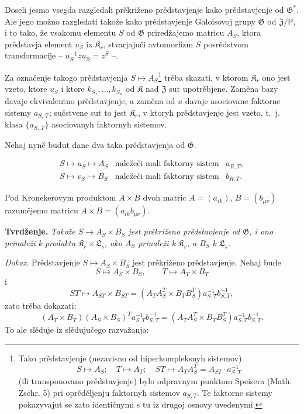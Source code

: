 \documentclass[11pt]{article}
\newcommand{\srcfn}[2]{\footnote{#2}}
\begin{document}
Doseli jesmo vsegda razgledali prěkriženo prědstavjenje kako prědstavjenje od \(\mathfrak{G}^*\). Ale jego možno razgledati takože kako prědstavjenje Galoisovoj grupy \(\mathfrak{G}\) od \(\mathfrak Z/\mathsf{P}\), i to tako, že vsakomu elementu \(S\) od \(\mathfrak{G}\) priredžajemo matricu \(A_S\), ktora prědstavja element \(u_S\) iz \(\mathfrak K_r\), stvarjajuči avtomorfizm \(S\) posrědstvom transformacije -- \(u_S^{-1}zu_S=z^S\) --.

Za označenje takogo prědstavjenja \(S\mapsto A_S\)\srcfn{1}{Tako prědstavjenje (nezavisno od hiperkompleksnyh sistemov)
\[
S\mapsto A_S;\quad T\mapsto A_T;\quad ST\mapsto A_TA_S^T=A_{ST}\cdot a_{S,T}^{-1}
\]
(ili transponovano prědstavjenje) bylo odpravnym punktom Speisera (Math. Zschr. 5) pri oprěděljenju faktornyh sistemov \(a_{S,T}\). Te faktorne sistemy pokazyvajut se zato identičnymi s tu iz drugoj osnovy uvedenymi.} trěba skazati, v ktorom \(\mathfrak K_r\) ono jest vzeto, ktore \(u_S\) i ktore \(k_{S_1},\ldots,k_{S_n}\) od \(\mathfrak K\) nad \(\mathfrak Z\) sut upotrěbjene. Zaměna bazy davaje ekvivalentno prědstavjenje, a zaměna od \(u\) davaje asociovane faktorne sistemy \(a_{S,\,T}\); sučstvene sut to jest \(\mathfrak K_r\), v ktoryh prědstavjenje jest vzeto, t.~j. klasa \(\{a_{S,\,T}\}\) asociovanyh faktornyh sistemov.

Nehaj nyně budut dane dva taka prědstavjenja od \(\mathfrak G\).

\[
\begin{array}{lll}
S\mapsto u_S\mapsto A_S & \text{naležeči mali faktorny sistem} & a_{R,T},\\
S\mapsto v_S\mapsto B_S & \text{naležeči mali faktorny sistem} & b_{R,T}.
\end{array}
\]

Pod Kronekerovym produktom \(A\times B\) dvoh matric \(A=(a_{ik})\), \(B=(b_{\mu\nu})\) razumějemo matricu \(A\times B=(a_{ik}b_{\mu\nu})\).

\noindent\textbf{Tvrdženje.} \emph{Takože \(S\to A_S\times B_S\) jest prěkriženo prědstavjenje od \(\mathfrak G\), i ono prinaleži k produktu \(\mathfrak K_r\times\mathfrak L_s\), ako \(A_S\) prinaleži k \(\mathfrak K_r\), a \(B_S\) k \(\mathfrak L_s\).}

\noindent\emph{Dokaz.} Prědstavjenje \(S\mapsto A_S\times B_S\) jest prěkriženo prědstavjenje. Nehaj bude
\[
S\mapsto A_S\times B_S,\qquad T\mapsto A_T\times B_T
\]
i
\[
ST\mapsto A_{ST}\times B_{ST}
=(A_TA_S^T\times B_TB_S^T)a_{S,T}^{-1}b_{S,T}^{-1},
\]
zato trěba dokazati:
\[
(A_T\times B_T)(A_S\times B_S)^T a_{S,T}^{-1}b_{S,T}^{-1}
=(A_TA_S^T\times B_TB_S^T)a_{S,T}^{-1}b_{S,T}^{-1}.
\]
To ale slěduje iz slědujučego razvažanja:
\end{document}
